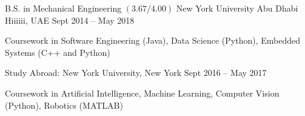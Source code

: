 

\begin{cventries}

  \college
    {B.S. in Mechanical Engineering $(3.67/4.00)$} %
    {New York University Abu Dhabi } %
    {Hiiiiii, UAE} %
    {Sept 2014 -- May 2018} %
    {\begin{cvitems}
    \item{Coursework in Software Engineering (Java), Data Science (Python), Embedded Systems (C++ and Python)}
    \end{cvitems}}
    {Study Abroad: New York University, New York}
    {Sept 2016 -- May 2017}
    {\begin{cvitems}
    \item{Coursework in Artificial Intelligence, Machine Learning, Computer Vision (Python), Robotics (MATLAB)} 
    \end{cvitems}
    }
  
\end{cventries}
